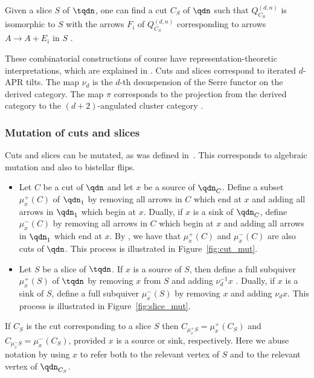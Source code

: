 Given a slice $S$ of $\tqdn$, one can find a cut $C_{S}$ of $\qdn$ such that $Q_{C_{S}}^{(d, n)}$ is isomorphic to $S$ with the arrows $F_{i}$ of $Q_{C_{S}}^{(d, n)}$ corresponding to arrows $A \to A + E_{i}$ in $S$ \cite[Theorem 5.24]{io}.

\begin{rema}
These combinatorial constructions of course have representation-theoretic interpretations, which are explained in \cite{io}. Cuts and slices correspond to iterated $d$-APR tilts. The map $\nu_{d}$ is the $d$-th desuspension of the Serre functor on the derived category. The map $\pi$ corresponds to the projection from the derived category to the $(d + 2)$-angulated cluster category \cite{ot}.
\end{rema}

\subsubsection{Mutation of cuts and slices}\label{sect:back:cut_slice:mut}

Cuts and slices can be mutated, as was defined in~\cite{io}. This corresponds to algebraic mutation and also to bistellar flips.
\begin{itemize}
\item Let $C$ be a cut of $\qdn$ and let $x$ be a source of $\qdn_{C}$. Define a subset $\mu_{x}^{+}(C)$ of $\qdn_{1}$ by removing all arrows in $C$ which end at $x$ and adding all arrows in $\qdn_{1}$ which begin at $x$. Dually, if $x$ is a sink of $\qdn_{C}$, define $\mu_{x}^{-}(C)$ by removing all arrows in $C$ which begin at $x$ and adding all arrows in $\qdn_{1}$ which end at $x$. By \cite[Proposition 5.14]{io}, we have that $\mu_{x}^{+}(C)$ and $\mu_{x}^{-}(C)$ are also cuts of $\qdn$. This process is illustrated in Figure~\ref{fig:cut_mut}.
\item Let $S$ be a slice of $\tqdn$. If $x$ is a source of $S$, then define a full subquiver $\mu_{x}^{+}(S)$ of $\tqdn$ by removing $x$ from $S$ and adding $\nu_{d}^{-1}x$ \cite[Definition 5.25]{io}. Dually, if $x$ is a sink of $S$, define a full subquiver $\mu_{x}^{-}(S)$ by removing $x$ and adding $\nu_{d}x$. This process is illustrated in Figure~\ref{fig:slice_mut}.
\end{itemize}
If $C_{S}$ is the cut corresponding to a slice $S$ then $C_{\mu_{x}^{+}{S}} = \mu_{x}^{+}(C_{S})$ and $C_{\mu_{x}^{-}{S}} = \mu_{x}^{-}(C_{S})$, provided $x$ is a source or sink, respectively. Here we abuse notation by using $x$ to refer both to the relevant vertex of $S$ and to the relevant vertex of $\qdn_{C_{S}}$.

